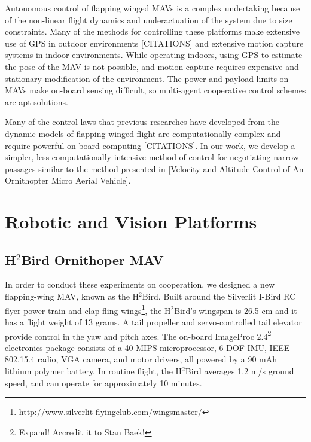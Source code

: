 \documentclass{aamas2013}
\begin{document}
Autonomous control of flapping winged MAVs is a complex undertaking because
of the non-linear flight dynamics and underactuation of the system due to size
constraints. Many of the methods for controlling these platforms make
extensive use of GPS in outdoor environments [CITATIONS] and extensive motion
capture systems in indoor environments. While operating indoors, using GPS to 
estimate the pose of the MAV is not possible, and motion capture requires expensive
and stationary modification of the environment. The power and payload limits on MAVs
make on-board sensing difficult, so multi-agent cooperative control schemes are 
apt solutions.

Many of the control laws that previous researches have developed from the 
dynamic models of flapping-winged flight are computationally complex and 
require powerful on-board computing [CITATIONS]. In our work, we develop a 
simpler, less computationally intensive method of control for negotiating 
narrow passages similar to the method presented in [Velocity and Altitude Control of An Ornithopter Micro Aerial Vehicle].  

\section{Robotic and Vision Platforms}

\subsection{H$^2$Bird Ornithoper MAV}
In order to conduct these experiments on cooperation, we designed a new
flapping-wing MAV, known as the H$^2$Bird. Built around the Silverlit I-Bird 
RC flyer power train and clap-fling 
wings\footnote{\url{http://www.silverlit-flyingclub.com/wingsmaster/}}, 
the H$^2$Bird's wingspan is 26.5 cm and it has a flight weight of 13 grams. A 
tail propeller and servo-controlled tail elevator provide control in the yaw 
and pitch axes. The on-board ImageProc 2.4\footnote{Expand! Accredit it to Stan Baek!} 
electronics package consists of a 40 MIPS microprocessor, 6 DOF IMU, 
IEEE 802.15.4 radio, VGA camera, and motor drivers, all powered by a 90 mAh 
lithium polymer battery. In routine flight, the H$^2$Bird averages 1.2 m/s 
ground speed, and can operate for approximately 10 minutes.
\end{document}
